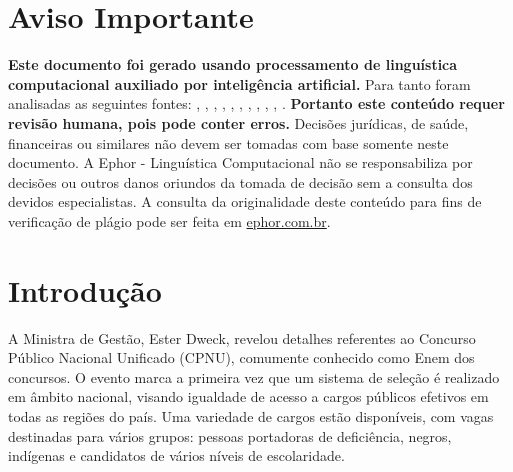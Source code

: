 \documentclass[
   article,       
   12pt,          
   oneside,       
   a4paper,       
   english,       
   brazil,        
   sumario=tradicional
   ]{abntex2}
\begin{document}
\frenchspacing 
\maketitle

\textual
\section{Aviso Importante}
\textbf{Este documento foi gerado usando processamento de linguística computacional auxiliado por inteligência artificial.} Para tanto foram analisadas as seguintes fontes:  \cite{A_separacao_dos_tres_poderes_Executivo_Legisl}, \cite{Como_vai_funcionar_o_Concurso_Publico_Naciona}, \cite{Concurso_Nacional_Unificado_edital_e_retifica}, \cite{Concurso_unificado_a_novidade_do_momentotggcv}, \cite{Concurso_Unificado_Divulgadas_novas_retificac}, \cite{Enem_dos_Concursos_cerca_de_2_mil_vagas_serao}, \cite{Enem_dos_Concursos_quando_comeca_quanto_custa}, \cite{Enem_dos_concursos_tem_vagas_para_o_Tocantins}, \cite{Inscricoes_para_Enem_dos_Concursos_comecam_ne}, \cite{ldquoEnem_dos_Concursosrdquo_recebe_mais_de_7}, \cite{Saiba_como_vai_funcionar_o_Enem_dos_concursos}.
\textbf{Portanto este conteúdo requer revisão humana, pois pode conter erros.} Decisões jurídicas, de saúde, financeiras ou similares não devem ser tomadas com base somente neste documento. A Ephor - Linguística Computacional não se responsabiliza por decisões ou outros danos oriundos da tomada de decisão sem a consulta dos devidos especialistas.
A consulta da originalidade deste conteúdo para fins de verificação de plágio pode ser feita em \href{http://www.ephor.com.br}{ephor.com.br}.
\section {Introdução}A Ministra de Gestão, Ester Dweck, revelou detalhes referentes ao Concurso Público Nacional Unificado (CPNU), comumente conhecido como \textquotedbl{}Enem dos concursos\textquotedbl{}. O evento marca a primeira vez que um sistema de seleção é realizado em âmbito nacional, visando igualdade de acesso a cargos públicos efetivos em todas as regiões do país. Uma variedade de cargos estão disponíveis, com vagas destinadas para vários grupos: pessoas portadoras de deficiência, negros, indígenas e candidatos de vários níveis de escolaridade.
\end{document}
